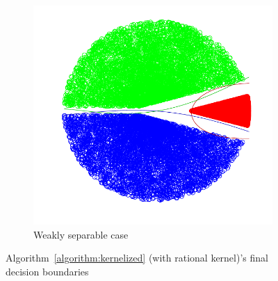 \begin{figure}[h!]
\begin{subfigure}[b]{0.23\textwidth}
        \hspace*{-0.3cm}  \includegraphics[width=1.15\textwidth, trim={0, 0cm, 0, 0}, clip]{figures/weak_rational_ova_points}
         \caption{Weakly separable case}
    \end{subfigure}
    \vspace*{-0.2cm}
    \caption{Algorithm~\ref{algorithm:kernelized} (with rational kernel)'s final decision boundaries}
    \label{fig:rationalova-points}
\end{figure}

